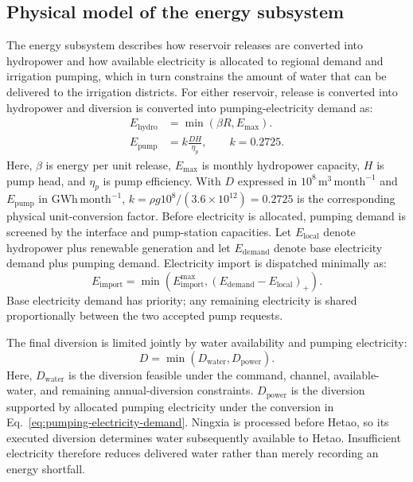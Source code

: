 \documentclass [a4paper,fleqn] {cas-dc}
\begin{document}
\subsection{Physical model of the energy subsystem}
\label{sec23}
The energy subsystem describes how reservoir releases are converted into hydropower and how available electricity is allocated to regional demand and irrigation pumping, which in turn constrains the amount of water that can be delivered to the irrigation districts. For either reservoir, release is converted into hydropower and diversion is converted into pumping-electricity demand as:
\begin{align}
  E_{\mathrm{hydro}}&=\min(\beta R,E_{\max}).
  \label{eq:energy-coupling}\\
  E_{\mathrm{pump}}&=k\frac{DH}{\eta_p},
  \qquad k=0.2725.
  \label{eq:pumping-electricity-demand}
\end{align}
Here, $\beta$ is energy per unit release, $E_{\max}$ is monthly hydropower capacity, $H$ is pump head, and $\eta_p$ is pump efficiency. With $D$ expressed in $10^8\,\mathrm{m^3\,month^{-1}}$ and $E_{\mathrm{pump}}$ in $\mathrm{GWh\,month^{-1}}$, $k=\rho g10^8/(3.6\times10^{12})=0.2725$ is the corresponding physical unit-conversion factor. Before electricity is allocated, pumping demand is screened by the interface and pump-station capacities. Let $E_{\mathrm{local}}$ denote hydropower plus renewable generation and let $E_{\mathrm{demand}}$ denote base electricity demand plus pumping demand. Electricity import is dispatched minimally as:
\begin{equation}
  E_{\mathrm{import}}=
  \min\!\left(E_{\mathrm{import}}^{\max},
  \left(E_{\mathrm{demand}}-E_{\mathrm{local}}\right)_+\right).
  \label{eq:electricity-import}
\end{equation}
Base electricity demand has priority; any remaining electricity is shared proportionally between the two accepted pump requests.

The final diversion is limited jointly by water availability and pumping electricity:
\begin{equation}
  D=\min\left(D_{\mathrm{water}},D_{\mathrm{power}}\right).
  \label{eq:final-diversion}
\end{equation}
Here, $D_{\mathrm{water}}$ is the diversion feasible under the command, channel, available-water, and remaining annual-diversion constraints. $D_{\mathrm{power}}$ is the diversion supported by allocated pumping electricity under the conversion in Eq.~\ref{eq:pumping-electricity-demand}. Ningxia is processed before Hetao, so its executed diversion determines water subsequently available to Hetao. Insufficient electricity therefore reduces delivered water rather than merely recording an energy shortfall.
\end{document}
